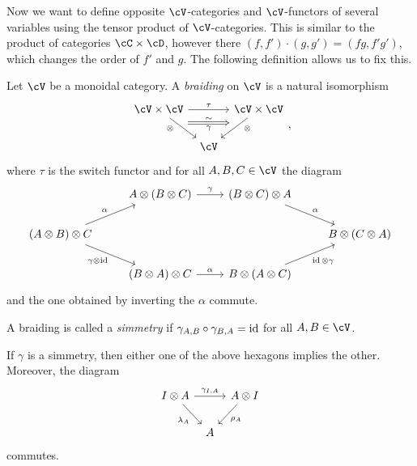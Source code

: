 \documentclass[a4paper,11pt,oneside,openany]{scrbook}
\begin{document}
Now we want to define opposite $\cV$-categories and $\cV$-functors of several variables using the tensor product of $\cV$-categories. This is similar to the product of categories $\cC\times\cD$, however there $(f,f')\cdot(g,g')=(fg,f'g')$, which changes the order of $f'$ and $g$. The following definition allows us to fix this.

\begin{defn}
	Let $\cV$ be a monoidal category. A \emph{braiding} on $\cV$ is a natural isomorphism
	\[
		\begin{tikzcd}[column sep=tiny]
			\cV\times\cV\ar[rr, "\tau"]\ar[dr, swap, near start, "\otimes", ""{name=A, anchor=center}]
			&& \cV\times\cV\ar[dl, near start, "\otimes", ""{name=B, anchor=center}] \\
			& \cV
			\ar[Rightarrow, shorten <= .8em, shorten >= .8em, "\gamma"', "\sim", from=A, to=B]
		\end{tikzcd}
		,\]
	where $\tau$ is the switch functor and for all $A,B,C\in\cV$ the diagram
	\[
		\begin{tikzcd}
			& A\otimes(B\otimes C)\ar[r, "\gamma"]
			& (B\otimes C)\otimes A\ar[dr, "\alpha"] \\
			(A\otimes B)\otimes C\ar[dr, swap, "\gamma\otimes\id"]\ar[ur, "\alpha"]
			&&& B\otimes(C\otimes A) \\
			& (B\otimes A)\otimes C\ar[r, "\alpha"]
			& B\otimes(A\otimes C)\ar[ur, swap, "\id\otimes\gamma"]
		\end{tikzcd}
	\]
	and the one obtained by inverting the $\alpha$ commute.

	A braiding is called a \emph{simmetry} if $\gamma_{A,B}\circ\gamma_{B,A}=\operatorname{id}$ for all $A,B\in\cV$.
\end{defn}

\begin{rmk}
	If $\gamma$ is a simmetry, then either one of the above hexagons implies the other. Moreover, the diagram
	\[
		\begin{tikzcd}[column sep=tiny]
			I\otimes A\ar[rr, "\gamma_{I,A}"]\ar[dr, swap, "\lambda_A"]
			&& A\otimes I\ar[dl, "\rho_A"] \\
			& A
		\end{tikzcd}
	\]
	commutes.
\end{rmk}
\end{document}
